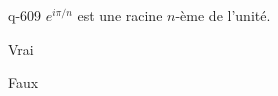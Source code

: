 \begin{truefalse}{q-609}
$e^{i\pi/n}$ est une racine $n$-ème de l'unité.
\item Vrai
\item* Faux
\end{truefalse}

